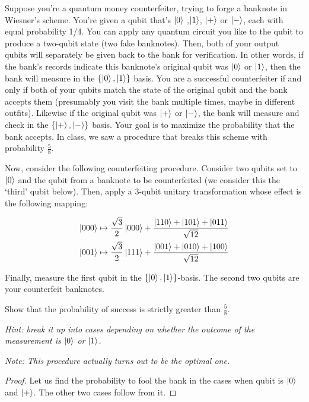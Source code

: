 \begin{solution}[label=ques:5]
  \begin{question}
    Suppose you're a quantum money counterfeiter, trying to forge a banknote in Wiesner's scheme.  You're given a qubit that's $\ket{0}$ ,$\ket{1}$, $\ket{+}$ or $\ket{-}$, each with equal probability 1/4.  You can apply any quantum circuit you like to the qubit to produce a two-qubit state (two fake banknotes). Then, both of your output qubits will separately be given back to the bank for verification. 
In other words, if the bank's records indicate this banknote's original qubit was $\ket{0}$ or $\ket{1}$, then the bank will measure in the $ \{\ket{0},\ket{1}\} $ basis. You are a successful counterfeiter if and only if both of your qubits match the state of the original qubit and the bank accepts them (presumably you visit the bank multiple times, maybe in different outfits). Likewise if the original qubit was $\ket{+}$ or $\ket{-}$, the bank will measure and check in the $\{ \ket{+},\ket{-} \}$ basis.  
Your goal is to maximize the probability that the bank accepts.
In class, we saw a procedure that breaks this scheme with probability $\frac{5}{8}$. 

Now, consider the following counterfeiting procedure. 
Consider two qubits set to $\ket{0}$ and the qubit from a banknote to be counterfeited (we consider this the `third' qubit below). Then, apply a 3-qubit unitary transformation whose effect is the following mapping:

\begin{align*}
	\ket{000} & \mapsto \frac{\sqrt{3}}{2} \ket{000} + \frac{\ket{110} + \ket{101} + \ket{011}}{\sqrt{12}} \\
	\ket{001} & \mapsto \frac{\sqrt{3}}{2} \ket{111} + \frac{\ket{001} + \ket{010} + \ket{100}}{\sqrt{12}} \\
\end{align*}

Finally, measure the first qubit in the $\{\ket{0},\ket{1}\}$-basis. The second two qubits are your counterfeit banknotes.

Show that the probability of success is strictly greater than $\frac{5}{8}$. 

\textit{Hint: break it up into cases depending on whether the outcome of the measurement is $\ket{0}$ or $\ket{1}$.}

\textit{Note: This procedure actually turns out to be the optimal one.}
  \end{question}
  \tcblower{}
  \begin{proof}
    Let us find the probability to fool the bank in the cases when qubit is $\ket{0}$ and $\ket{+}$. The other two cases follow from it.


\end{proof}
\end{solution}
